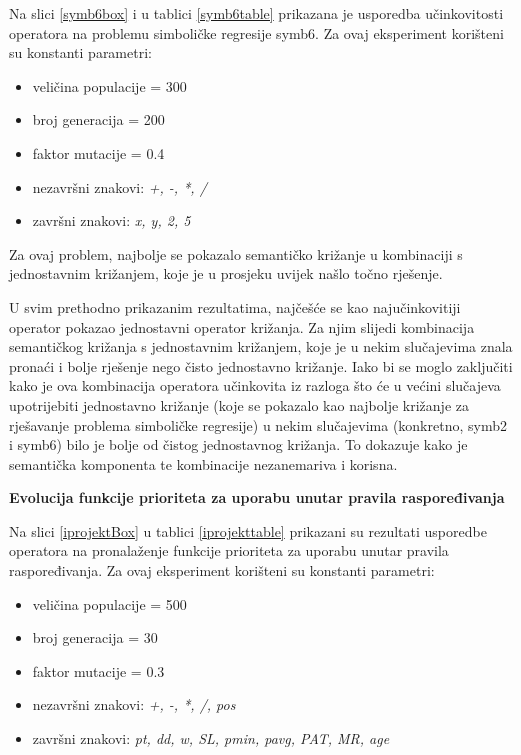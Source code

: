 Na slici \ref{symb6box} i u tablici \ref{symb6table} prikazana je usporedba učinkovitosti operatora na problemu simboličke regresije symb6. Za ovaj eksperiment korišteni su konstanti parametri:
\begin{itemize}
\item{veličina populacije = 300}
\item{broj generacija = 200}
\item{faktor mutacije = 0.4}
\item{nezavršni znakovi: \textit{ +, -, *, /}}
\item{završni znakovi: \textit{x, y, 2, 5}}
\end{itemize} 

Za ovaj problem, najbolje se pokazalo semantičko križanje u kombinaciji s jednostavnim križanjem, koje je u prosjeku uvijek našlo točno rješenje.


U svim prethodno prikazanim rezultatima, najčešće se kao najučinkovitiji operator pokazao jednostavni operator križanja. Za njim slijedi kombinacija semantičkog križanja s jednostavnim križanjem, koje je u nekim slučajevima znala pronaći i bolje rješenje nego čisto jednostavno križanje. Iako bi se moglo zaključiti kako je ova kombinacija operatora učinkovita iz razloga što će u većini slučajeva upotrijebiti jednostavno križanje (koje se pokazalo kao najbolje križanje za rješavanje problema simboličke regresije) u nekim slučajevima (konkretno, symb2 i symb6) bilo je bolje od čistog jednostavnog križanja. To dokazuje kako je semantička komponenta te kombinacije nezanemariva i korisna.



\textbf{Evolucija funkcije prioriteta za uporabu unutar pravila raspoređivanja}

Na slici \ref{iprojektBox} u tablici \ref{iprojekttable} prikazani su rezultati usporedbe operatora na pronalaženje funkcije prioriteta za uporabu unutar pravila raspoređivanja. Za ovaj eksperiment korišteni su konstanti parametri:
\begin{itemize}
\item{veličina populacije = 500}
\item{broj generacija = 30}
\item{faktor mutacije = 0.3}
\item{nezavršni znakovi: \textit{+, -, *, /, pos}}
\item{završni znakovi: \textit{pt, dd, w, SL, pmin, pavg, PAT, MR, age}}
\end{itemize} 

